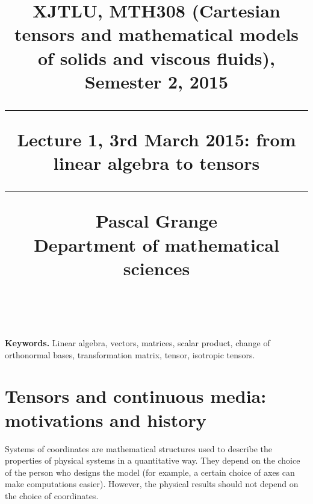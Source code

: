 \documentclass[DIV=12]{article}
\begin{document}


\title{
\noindent\hrulefill
\begin{flushleft}
{\Large \bf{XJTLU, MTH308 (Cartesian tensors and mathematical models of solids and viscous fluids), Semester 2, 2015\\
\vspace{8mm}
\hrule
\vspace{6mm}
 Lecture 1, 3rd March 2015: from linear algebra to tensors}}
\vspace{8mm}
\hrule
\vspace{6mm}
{\Large{Pascal Grange\\
Department of mathematical sciences\\
{}\\
}}
\noindent\hrulefill
\end{flushleft}}
\date{}
\author{}
\maketitle
\vspace{-3mm}

{\bf{Keywords.}} Linear algebra, vectors, matrices, scalar product, change of orthonormal bases,
 transformation matrix, tensor, isotropic tensors.\\
\vspace{3mm}

\tableofcontents

\clearpage
\section{Tensors and continuous media: motivations and history}

 Systems of coordinates are mathematical structures used to describe the properties
 of physical systems in a quantitative way. They depend on the choice of the person who
 designs the model (for example, a certain choice of axes can make computations easier).
 However, the physical results should not depend on the choice of coordinates.\\
\end{document}
